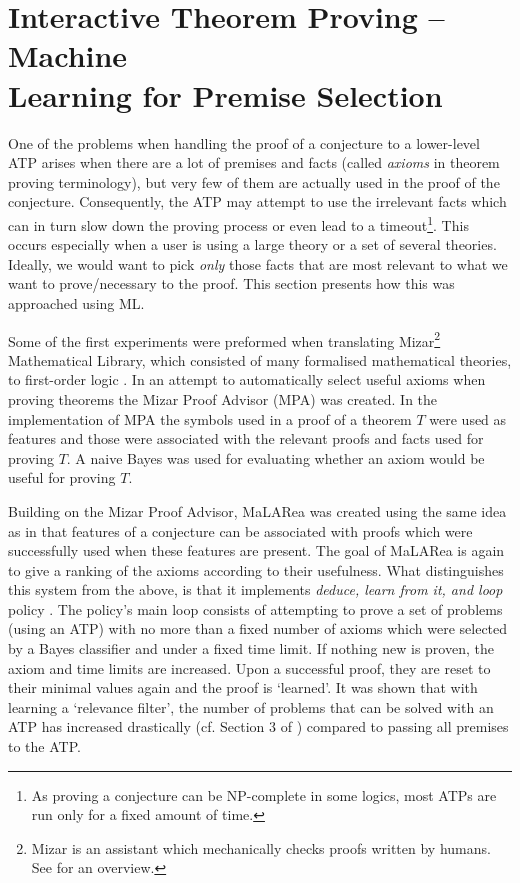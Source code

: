 \documentclass{article}
\begin{document}
\section{Interactive Theorem Proving -- Machine \\ Learning for Premise Selection}\label{sec:ITP}

One of the problems when handling the proof of a conjecture to a lower-level
ATP arises when there are a lot of premises and facts (called \emph{axioms} in
theorem proving terminology), but very few of them are actually used in the
proof of the conjecture. Consequently, the ATP may attempt to use the
irrelevant facts which can in turn slow down the proving process or even lead
to a timeout\footnote{As proving a conjecture can be NP-complete in some
logics, most ATPs are run only for a fixed amount of time.}. This occurs
especially when a user is using a large theory or a set of several theories.
Ideally, we would want to pick \emph{only} those facts that are most relevant
to what we want to prove/necessary to the proof. This section presents how this
was approached using ML.

Some of the first experiments were preformed when translating
Mizar\footnote{Mizar is an assistant which mechanically checks proofs written
by humans. See \cite{MizarOverview} for an overview.} Mathematical Library,
which consisted of many formalised mathematical theories, to first-order logic
\citep{MizarProofAdvisor}. In an attempt to automatically select useful axioms
when proving theorems the Mizar Proof Advisor (MPA) was created. In the
implementation of MPA the symbols used in a proof of a theorem $T$ were used as
features and those were associated with the relevant proofs and facts used for
proving $T$. A naive Bayes was used for evaluating whether an axiom would be
useful for proving $T$. 

Building on the Mizar Proof Advisor, MaLARea \citep{MaLARea} was created using
the same idea as in \cite{MizarProofAdvisor} that features of a conjecture can
be associated with proofs which were successfully used when these features are
present. The goal of MaLARea is again to give a ranking of the axioms according
to their usefulness. What distinguishes this system from the above, is that it
implements \emph{deduce, learn from it, and loop} policy \citep[p.~3]{MaLARea}.
The policy's main loop consists of attempting to prove a set of problems (using
an ATP) with no more than a fixed number of axioms which were selected by
a Bayes classifier and under a fixed time limit. If nothing new is proven, the
axiom and time limits are increased. Upon a successful proof, they are reset to
their minimal values again and the proof is `learned'. It was shown that with
learning a `relevance filter', the number of problems that can be solved with
an ATP has increased drastically (cf. Section 3 of \cite{MaLARea}) compared to
passing all premises to the ATP.
\end{document}
